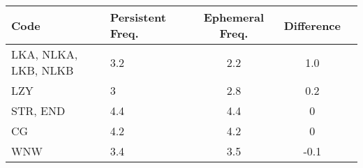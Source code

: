 \begin{adjustbox}{width=\textwidth}
\begin{tabular}{llccc}
\toprule
\textbf{Code} & \textbf{Persistent Freq.} & \textbf{Ephemeral Freq.} &  \textbf{Difference}\\  \midrule
LKA, NLKA, LKB, NLKB  & 3.2 &  2.2 & 1.0\\
\midrule
LZY  & 3 &  2.8& 0.2\\
\midrule
STR, END  & 4.4 & 4.4& 0\\ \midrule
CG & 4.2 & 4.2 & 0\\ \midrule
WNW & 3.4 & 3.5 & -0.1\\
\bottomrule
\end{tabular}
\end{adjustbox}
